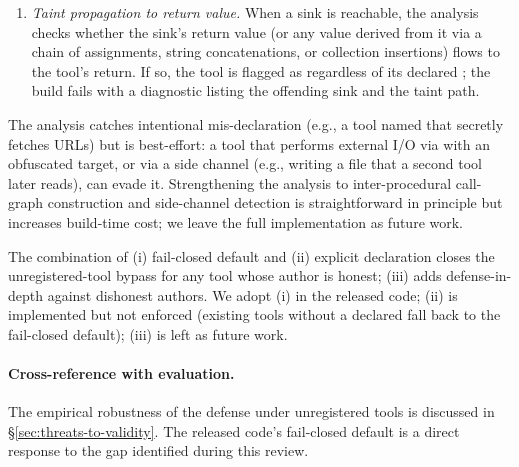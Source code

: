 \begin{enumerate}[leftmargin=*]
\begin{enumerate}[leftmargin=*,label=(\alph*)]
        \item \emph{Taint propagation to return value.} When a sink is reachable, the analysis checks whether the sink's return value (or any value derived from it via a chain of assignments, string concatenations, or collection insertions) flows to the tool's  return. If so, the tool is flagged as  regardless of its declared ; the build fails with a diagnostic listing the offending sink and the taint path.
    \end{enumerate}
    The analysis catches intentional mis-declaration (e.g., a tool named  that secretly fetches URLs) but is best-effort: a tool that performs external I/O via  with an obfuscated target, or via a side channel (e.g., writing a file that a second tool later reads), can evade it. Strengthening the analysis to inter-procedural call-graph construction and side-channel detection is straightforward in principle but increases build-time cost; we leave the full implementation as future work.
\end{enumerate}

The combination of (i) fail-closed default and (ii) explicit declaration closes the unregistered-tool bypass for any tool whose author is honest; (iii) adds defense-in-depth against dishonest authors. We adopt (i) in the released code; (ii) is implemented but not enforced (existing tools without a declared  fall back to the fail-closed default); (iii) is left as future work.

\paragraph{Cross-reference with evaluation.}
The empirical robustness of the defense under unregistered tools is discussed in \S\ref{sec:threats-to-validity}. The released code's fail-closed default is a direct response to the gap identified during this review.
